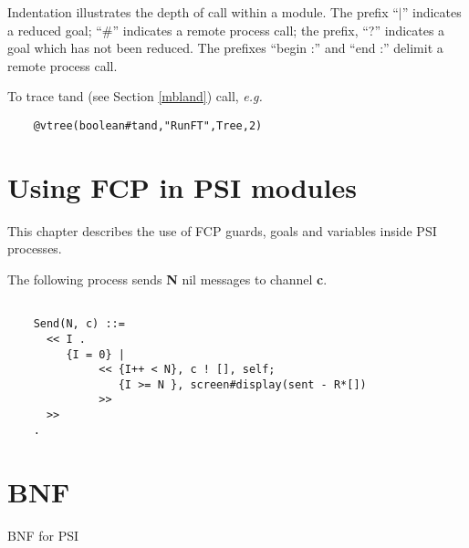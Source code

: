 \noindent
Indentation illustrates the depth of call within a module.
The prefix ``$|$'' indicates a reduced goal;
``\#'' indicates a remote process call; the prefix,
``?''  indicates a goal which has not been reduced.  The
prefixes ``begin :'' and ``end :'' delimit a remote process
call.

\noindent
To trace tand (see Section \ref{mbland}) call, {\em e.g.}

\begin{verbatim}
    @vtree(boolean#tand,"RunFT",Tree,2)
\end{verbatim}

\chapter{Using FCP in PSI modules}
\label{usingFCP}

This chapter describes the use of FCP guards, goals and
variables inside PSI processes.

The following process sends {\bf N} nil messages to channel {\bf c}.

\begin{verbatim}

    Send(N, c) ::=
      << I .
         {I = 0} |
              << {I++ < N}, c ! [], self;
                 {I >= N }, screen#display(sent - R*[])
              >>
      >>
    .
\end{verbatim}

\appendix
\chapter{BNF}
\label{BNF}
BNF for PSI

